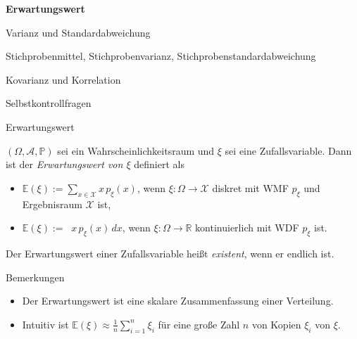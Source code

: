 \documentclass[
  8pt,
  ignorenonframetext,
]{beamer}
\providecommand{\tightlist}{%
  \setlength{\itemsep}{0pt}\setlength{\parskip}{0pt}}
\DeclareMathOperator*{\intinf}{\int_{-\infty}^{\infty}}
\begin{document}
\begin{frame}{}
\protect\hypertarget{section-6}{}
\large
\vfill

\textbf{Erwartungswert}

Varianz und Standardabweichung

Stichprobenmittel, Stichprobenvarianz, Stichprobenstandardabweichung

Kovarianz und Korrelation

Selbstkontrollfragen \vfill
\end{frame}

\begin{frame}{Erwartungswert}
\protect\hypertarget{erwartungswert}{}
\small
\begin{definition}[Erwartungswert]
\justifying
$(\Omega, \mathcal{A},\mathbb{P})$ sei ein Wahrscheinlichkeitsraum und $\xi$
sei eine  Zufallsvariable. Dann ist der \textit{Erwartungswert von $\xi$} definiert als
\begin{itemize}
\item 
$\mathbb{E}(\xi)
:=
\sum_{x \in \mathcal{X}} x\,p_\xi(x)$,
wenn $\xi : \Omega \to \mathcal{X}$ diskret mit WMF $p_\xi$ und Ergebnisraum $\mathcal{X}$ ist,
\item
$\mathbb{E}(\xi)
:=
\intinf x \,p_\xi(x)\,dx$,
wenn $\xi : \Omega \to \mathbb{R}$ kontinuierlich mit WDF $p_\xi$ ist.
\end{itemize}
Der Erwartungswert einer Zufallsvariable heißt \textit{existent}, wenn er endlich ist.
\end{definition}

Bemerkungen

\begin{itemize}
\tightlist
\item
  Der Erwartungswert ist eine skalare Zusammenfassung einer Verteilung.
\item
  Intuitiv ist \(\mathbb{E}(\xi) \approx \frac{1}{n}\sum_{i=1}^n \xi_i\)
  für eine große Zahl \(n\) von Kopien \(\xi_i\) von \(\xi\).
\end{itemize}
\end{frame}
\end{document}
